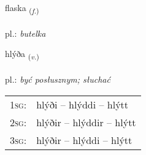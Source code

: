 \documentclass[frontgrid, backgrid]{flacards}\usepackage[]{graphicx}\usepackage[]{xcolor}
\begin{document}
\renewcommand{\flhead}{\vskip5pt \fboxsep=0pt {\small\bfseries\footnotesize Nafnorð | rzeczownik}}
\renewcommand{\fcfoot}{\vskip5pt \fboxsep=0pt \hspace{2pt}{\small\bfseries\footnotesize 3K}}

\renewcommand{\blhead}{\vskip5pt {\small\bfseries\footnotesize Nafnorð | rzeczownik }}
\renewcommand{\bcfoot}{\vskip5pt \hspace{2pt}{\small\bfseries\footnotesize 3K}}


{flaska \small{\textsubscript{(\textit{f.})}} \\[1ex] %
\textphonetic{[flaska]} \\
pl.: \emph{butelka} \\  [2ex]
\renewcommand*{\arraystretch}{0.8}
}

\renewcommand{\flhead}{\vskip5pt \fboxsep=0pt {\small\bfseries\footnotesize Sagnorð | czasownik}}
\renewcommand{\fcfoot}{\vskip5pt \fboxsep=0pt \hspace{2pt}{\small\bfseries\footnotesize 3K}}

\renewcommand{\blhead}{\vskip5pt {\small\bfseries\footnotesize Sagnorð | czasownik }}
\renewcommand{\bcfoot}{\vskip5pt \hspace{2pt}{\small\bfseries\footnotesize 3K}}


{hlýða \small{\textsubscript{(\textit{v.})}} \\[1ex] %
\textphonetic{[l̥iːða]} \\
pl.: \emph{być posłusznym; słuchać} \\  [2ex]
\renewcommand*{\arraystretch}{0.8}
\begin{tabular}{p{1cm}l}
\textsc{1sg}: & hlýði -- hlýddi -- hlýtt \\ 
\textsc{2sg}: & hlýðir -- hlýddir -- hlýtt \\ 
\textsc{3sg}: & hlýðir -- hlýddi -- hlýtt \\ 
\end{tabular}
}
\end{document}
